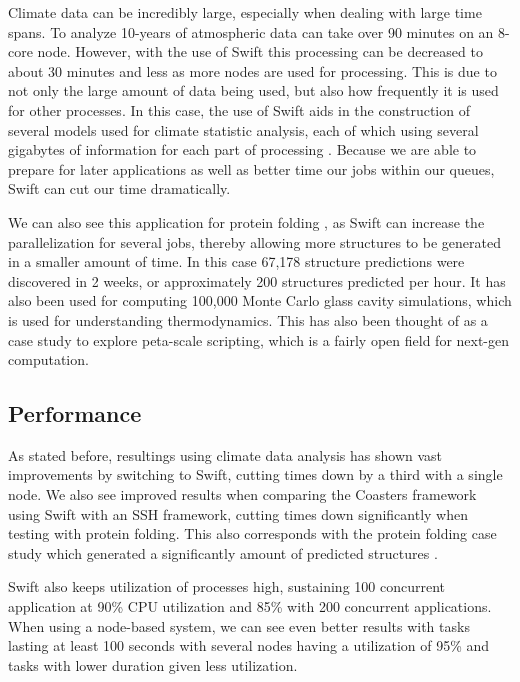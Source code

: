    Climate data can be incredibly large, especially when dealing with large time spans. To analyze 10-years of atmospheric data can take over 90 minutes on an 8-core node. However, with the use of Swift this processing can be decreased to about 30 minutes and less as more nodes are used for processing. This is due to not only the large amount of data being used, but also how frequently it is used for other processes. In this case, the use of Swift aids in the construction of several models used for climate statistic analysis, each of which using several gigabytes of information for each part of processing \cite{woitaszek2011parallel}. Because we are able to prepare for later applications as well as better time our jobs within our queues, Swift can cut our time dramatically.

    We can also see this application for protein folding \cite{wilde2009parallel}, as Swift can increase the parallelization for several jobs, thereby allowing more structures to be generated in a smaller amount of time. In this case 67,178 structure predictions were discovered in 2 weeks, or approximately 200 structures predicted per hour. It has also been used for computing 100,000 Monte Carlo glass cavity simulations, which is used for understanding thermodynamics. This has also been thought of as a case study to explore peta-scale scripting, which is a fairly open field for next-gen computation.

\subsection{Performance}

    As stated before, resultings using climate data analysis \cite{woitaszek2011parallel} has shown vast improvements by switching to Swift, cutting times down by a third with a single node. We also see improved results when comparing the Coasters framework using Swift with an SSH framework, cutting times down significantly when testing with protein folding. This also corresponds with the protein folding case study which generated a significantly amount of predicted structures \cite{wilde2009parallel}.

    Swift also keeps utilization of processes high, sustaining 100 concurrent application at 90\% CPU utilization and 85\% with 200 concurrent applications. When using a node-based system, we can see even better results with tasks lasting at least 100 seconds with several nodes having a utilization of 95\% and tasks with lower duration given less utilization.

